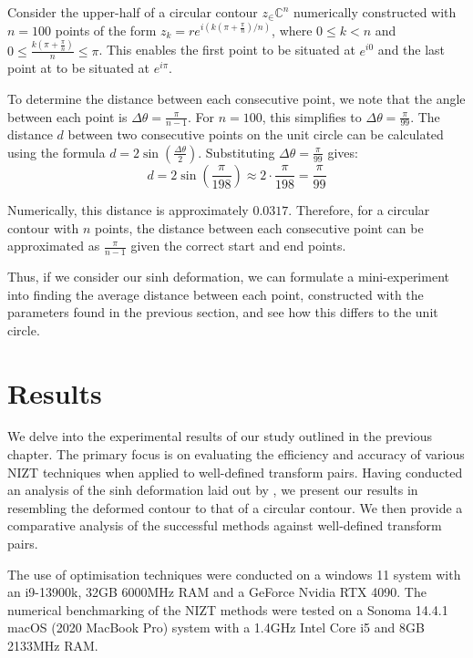 \documentclass[a4paper]{report}
\begin{document}
\begin{example}\label{example:point_diff}
Consider the upper-half of a circular contour $z_\in \mathbb{C}^n$ numerically constructed with $n = 100$ points of the form $z_k = re^{i(k(\pi + \frac{\pi}{n}) / n)}$, where $0 \leq k < n$ and $0 \leq \frac{k(\pi + \frac{\pi}{n})}{n} \leq \pi$. This enables the first point to be situated at $e^{i0}$ and the last point at to be situated at $e^{i\pi}$.

To determine the distance between each consecutive point, we note that the angle between each point is $\Delta \theta = \frac{\pi}{n-1}$. For $n = 100$, this simplifies to $\Delta \theta = \frac{\pi}{99}$. The distance $d$ between two consecutive points on the unit circle can be calculated using the formula $d = 2 \sin\left(\frac{\Delta \theta}{2}\right)$. Substituting $\Delta \theta = \frac{\pi}{99}$ gives:
\begin{equation*}
d = 2 \sin\left(\frac{\pi}{198}\right) \approx 2 \cdot \frac{\pi}{198} = \frac{\pi}{99}
\end{equation*}

Numerically, this distance is approximately $0.0317$. Therefore, for a circular contour with $n$ points, the distance between each consecutive point can be approximated as $\frac{\pi}{n-1}$ given the correct start and end points.
\end{example}

Thus, if we consider our sinh deformation, we can formulate a mini-experiment into finding the average distance between each point, constructed with the parameters found in the previous section, and see how this differs to the unit circle.
\chapter{Results}
We delve into the experimental results of our study outlined in the previous chapter. The primary focus is on evaluating the efficiency and accuracy of various NIZT techniques when applied to well-defined transform pairs. Having conducted an analysis of the sinh deformation laid out by \citet{levendorskii2022sinh}, we present our results in resembling the deformed contour to that of a circular contour. We then provide a comparative analysis of the successful methods against well-defined transform pairs.

The use of optimisation techniques were conducted on a windows 11 system with an i9-13900k, 32GB 6000MHz RAM and a GeForce Nvidia RTX 4090. The numerical benchmarking of the NIZT methods were tested on a Sonoma 14.4.1 macOS (2020 MacBook Pro) system with a 1.4GHz Intel Core i5 and 8GB 2133MHz RAM.
\end{document}
